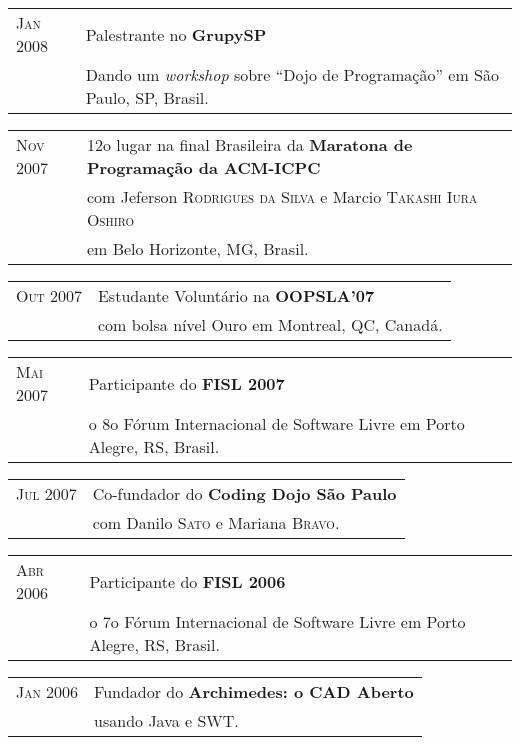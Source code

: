 \documentclass[letter,10pt]{article}
\begin{document}
\begin{tabular}{p{2.5cm}l}
  \textsc{Jan 2008} & Palestrante no \textbf{GrupySP}\\
  &Dando um \textit{workshop} sobre ``Dojo de Programação'' em São Paulo, SP, Brasil.\\
\end{tabular}

\begin{tabular}{p{2.5cm}l}
  \textsc{Nov 2007} & 12o lugar na final Brasileira da
  \textbf{Maratona de Programação da ACM-ICPC}\\
  & com Jeferson \textsc{Rodrigues da Silva} e Marcio
  \textsc{Takashi Iura Oshiro}\\
  & em Belo Horizonte, MG, Brasil.\\
\end{tabular}

\begin{tabular}{p{2.5cm}l}
  \textsc{Out 2007} & Estudante Voluntário na \textbf{OOPSLA'07}\\
  & com bolsa nível Ouro em Montreal, QC, Canadá.\\
\end{tabular}

\begin{tabular}{p{2.5cm}l}
  \textsc{Mai 2007} & Participante do \textbf{FISL 2007}\\
  & o 8o Fórum Internacional de Software Livre em Porto
  Alegre, RS, Brasil.\\
\end{tabular}

\begin{tabular}{p{2.5cm}l}
  \textsc{Jul 2007} & Co-fundador do \textbf{Coding Dojo São Paulo}\\
  & com Danilo \textsc{Sato} e Mariana \textsc{Bravo}.\\
\end{tabular}

\begin{tabular}{p{2.5cm}l}
  \textsc{Abr 2006} & Participante do \textbf{FISL 2006}\\
  & o 7o Fórum Internacional de Software Livre em Porto
  Alegre, RS, Brasil.\\
\end{tabular}

\begin{tabular}{p{2.5cm}l}
  \textsc{Jan 2006} & Fundador do \textbf{Archimedes: o CAD Aberto}\\
  & usando Java e SWT.\\
\end{tabular}
\end{document}
